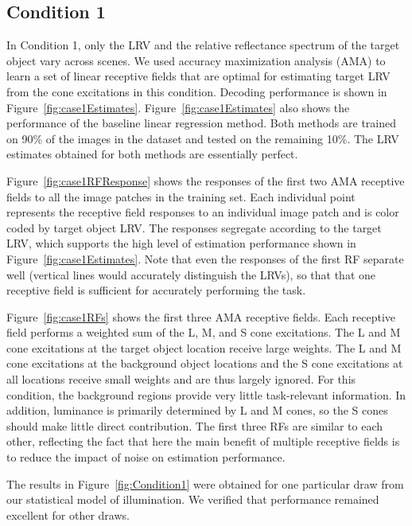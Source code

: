 \documentclass{jov}
\begin{document}
\subsection{Condition 1}

In Condition 1, only the LRV and the relative reflectance spectrum of the target object vary across scenes.
We used accuracy maximization analysis (AMA) to learn a set of linear receptive fields that are optimal for estimating target LRV from the cone excitations in this condition. 
Decoding performance is shown in Figure~\ref{fig:case1Estimates}. 
Figure~\ref{fig:case1Estimates} also shows the performance of the baseline linear regression method. 
Both methods are trained on 90\% of the images in the dataset and tested on the remaining 10\%.
The LRV estimates obtained for both methods are essentially perfect.

Figure~\ref{fig:case1RFResponse} shows the responses of the first two AMA receptive fields to all the image patches in the training set.
Each individual point represents the receptive field responses to an individual image patch and
is color coded by target object LRV.
The responses segregate according to the target LRV, which supports the high level 
of estimation performance shown in Figure~\ref{fig:case1Estimates}.
Note that even the responses of the first RF separate well (vertical lines would accurately
distinguish the LRVs), so that that one receptive field is sufficient for accurately performing the task.

Figure~\ref{fig:case1RFs} shows the first three AMA receptive fields.
Each receptive field performs a weighted sum of the L, M, and S cone excitations.
The L and M cone excitations at the target object location receive large weights.
The L and M cone excitations at the background object locations and the S cone excitations at all locations receive small weights and are thus largely ignored. 
For this condition, the background regions provide very little task-relevant information. 
In addition, luminance is primarily determined by L and M cones, so the S cones should make little
direct contribution.
The first three RFs are similar to each other, reflecting the fact that here the main benefit
of multiple receptive fields is to reduce the impact of noise on estimation performance.

The results in Figure~\ref{fig:Condition1} were obtained for one particular draw from our statistical model of illumination.
We verified that performance remained excellent for other draws.
\end{document}
